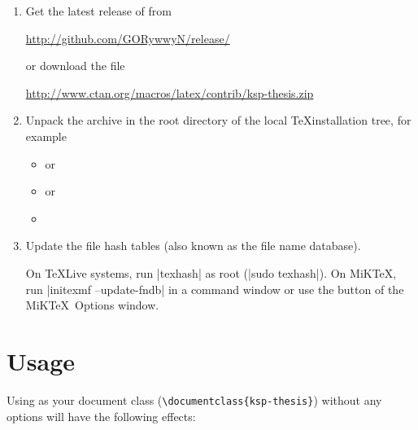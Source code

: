 \begin{enumerate}
   \item Get the latest release of  from

      \url{http://github.com/GORywwyN/release/}

   or download the file

      \url{http://www.ctan.org/macros/latex/contrib/ksp-thesis.zip}

   \item Unpack the archive in the root directory of the local \TeX installation tree, for example
   
   \begin{itemize}
      \item {} or
      \item {} or
      \item {}
   \end{itemize}

\item Update the file hash tables (also known as the file name database).
   
   On \TeX Live systems, run |texhash| as root (|sudo texhash|). On MiK\TeX, run |initexmf --update-fndb| in a command window or use the  button of the MiK\TeX\ Options window.
\end{enumerate}


\section{Usage}

Using  as your document class (\lstinline|\documentclass{ksp-thesis}|) without any options will have the following effects:

